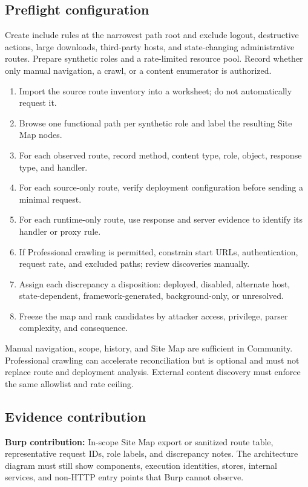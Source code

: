 \documentclass[11pt]{article}
\newcommand{\weekfield}[2]{%
  \Needspace{5\baselineskip}
  \subsection*{#1}
  #2
}
\newcommand{\burpevidence}[1]{\textbf{Burp contribution:} #1}
\begin{document}
\weekfield{Preflight configuration}{Create include rules at the narrowest path
root and exclude logout, destructive actions, large downloads, third-party
hosts, and state-changing administrative routes. Prepare synthetic roles and a
rate-limited resource pool. Record whether only manual navigation, a crawl, or a
content enumerator is authorized.}

\begin{procedurebox}
\begin{enumerate}
  \item Import the source route inventory into a worksheet; do not automatically request it.
  \item Browse one functional path per synthetic role and label the resulting Site Map nodes.
  \item For each observed route, record method, content type, role, object, response type, and handler.
  \item For each source-only route, verify deployment configuration before sending a minimal request.
  \item For each runtime-only route, use response and server evidence to identify its handler or proxy rule.
  \item If Professional crawling is permitted, constrain start URLs, authentication, request rate, and excluded paths; review discoveries manually.
  \item Assign each discrepancy a disposition: deployed, disabled, alternate host, state-dependent, framework-generated, background-only, or unresolved.
  \item Freeze the map and rank candidates by attacker access, privilege, parser complexity, and consequence.
\end{enumerate}
\end{procedurebox}

\begin{editionbox}
Manual navigation, scope, history, and Site Map are sufficient in Community.
Professional crawling can accelerate reconciliation but is optional and must not
replace route and deployment analysis. External content discovery must enforce
the same allowlist and rate ceiling.
\end{editionbox}

\weekfield{Evidence contribution}{\burpevidence{In-scope Site Map export or
sanitized route table, representative request IDs, role labels, and discrepancy
notes.} The architecture diagram must still show components, execution identities,
stores, internal services, and non-HTTP entry points that Burp cannot observe.}
\end{document}
